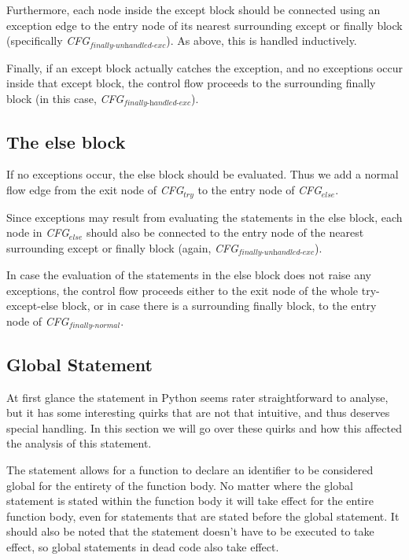 Furthermore, each node inside the except block should be connected using an exception edge to the entry node
 of its nearest surrounding except or finally block (specifically \textit{CFG$_{\textit{finally-unhandled-exc}}$}). As above, this is handled inductively.

Finally, if an except block actually catches the exception, and no exceptions occur inside that except block, 
the control flow proceeds to the surrounding finally block (in this case, \textit{CFG$_{\textit{finally-handled-exc}}$}). 



\subsection{The else block}
If no exceptions occur, the else block should be evaluated. Thus we add a normal flow edge from the exit node of \textit{CFG$_{\textit{try}}$} 
to the entry node of \textit{CFG$_{\textit{else}}$}.

Since exceptions may result from evaluating the statements in the else block, each node in \textit{CFG$_{\textit{else}}$} 
should also be connected to the entry node of the nearest surrounding except or finally block (again, \textit{CFG$_{\textit{finally-unhandled-exc}}$}).

In case the evaluation of the statements in the else block does not raise any exceptions, 
the control flow proceeds either to the exit node of the whole try-except-else block, or in case there is a surrounding finally block, 
to the entry node of \textit{CFG$_{\textit{finally-normal}}$}.



\subsection{Global Statement}
At first glance the  statement in Python seems rater straightforward to analyse, but it has some interesting quirks that are not that intuitive, and thus deserves special handling. In this section we will go over these quirks and how this affected the analysis of this statement.

The statement allows for a function to declare an identifier to be considered global for the entirety of the function body. No matter where the global statement is stated within the function body it will take effect for the entire function body, even for statements that are stated before the global statement. It should also be noted that the statement doesn't have to be executed to take effect, so global statements in dead code also take effect.


